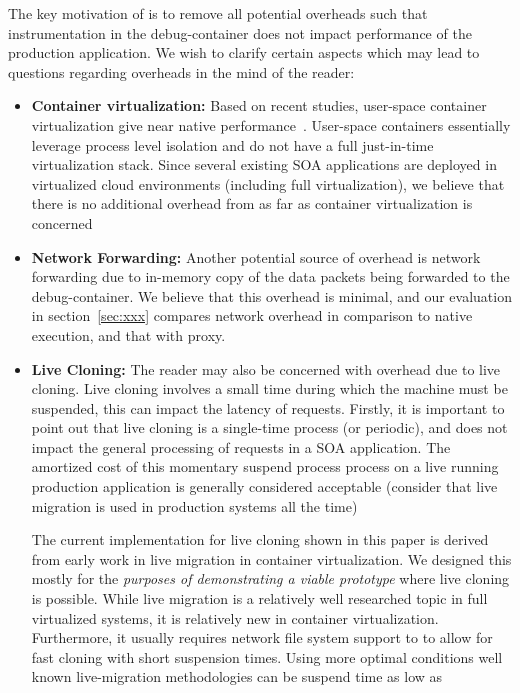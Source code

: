 The key motivation of \parikshan is to remove all potential overheads such that instrumentation in the debug-container does not impact performance of the production application.
We wish to clarify certain aspects which may lead to questions regarding overheads in the mind of the reader:
\begin{itemize}
	\item \textbf{Container virtualization:} Based on recent studies, user-space container virtualization give near native performance~\cite{performanceComparisonlxcVM,performanceEvalContainers}. 
	User-space containers essentially leverage process level isolation and do not have a full just-in-time virtualization stack.
	Since several existing SOA applications are deployed in virtualized cloud environments (including full virtualization), we believe that there is no additional overhead from \parikshan as far as container virtualization is concerned
	
	\item \textbf{Network Forwarding:} 
	Another potential source of overhead is network forwarding due to in-memory copy of the data packets being forwarded to the debug-container. 
	We believe that this overhead is minimal, and our evaluation in section~\ref{sec:xxx} compares network overhead in comparison to native execution, and that with proxy.
	
	\item \textbf{Live Cloning:}
	The reader may also be concerned with overhead due to live cloning.
	Live cloning involves a small time during which the machine must be suspended, this can impact the latency of requests.
	Firstly, it is important to point out that live cloning is a single-time process (or periodic), and does not impact the general processing of requests in a SOA application.   
	The amortized cost of this momentary suspend process process on a live running production application is generally considered acceptable (consider that live migration is used in production systems all the time)
	
	The current implementation for live cloning shown in this paper is derived from early work in live migration in container virtualization. 
	We designed this mostly for the \emph{purposes of demonstrating a viable prototype} where live cloning is possible.
	While live migration is a relatively well researched topic in full virtualized systems, it is relatively new in container virtualization.
	Furthermore, it usually requires network file system support to to allow for fast cloning with short suspension times.
	Using more optimal conditions well known live-migration methodologies can be suspend time as low as 
	

\end{itemize}


